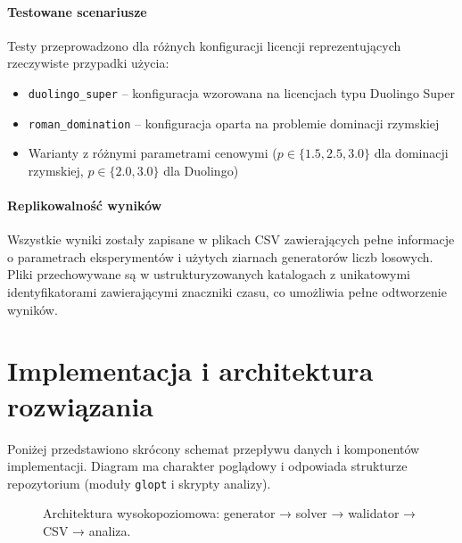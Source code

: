 \paragraph{Testowane scenariusze}
Testy przeprowadzono dla różnych konfiguracji licencji reprezentujących rzeczywiste przypadki użycia:
\begin{itemize}
  \item \texttt{duolingo\_super} -- konfiguracja wzorowana na licencjach typu Duolingo Super
  \item \texttt{roman\_domination} -- konfiguracja oparta na problemie dominacji rzymskiej
  \item Warianty z różnymi parametrami cenowymi ($p \in \{1.5, 2.5, 3.0\}$ dla dominacji rzymskiej, $p \in \{2.0, 3.0\}$ dla Duolingo)
\end{itemize}

\paragraph{Replikowalność wyników}
Wszystkie wyniki zostały zapisane w plikach CSV zawierających pełne informacje o parametrach eksperymentów i użytych ziarnach generatorów liczb losowych. Pliki przechowywane są w ustrukturyzowanych katalogach z unikatowymi identyfikatorami zawierającymi znaczniki czasu, co umożliwia pełne odtworzenie wyników.

\section{Implementacja i architektura rozwiązania}

Poniżej przedstawiono skrócony schemat przepływu danych i komponentów implementacji. Diagram ma charakter poglądowy i odpowiada strukturze repozytorium (moduły \texttt{glopt} i skrypty analizy).

\begin{figure}[H]
  \centering
  \caption{Architektura wysokopoziomowa: generator → solver → walidator → CSV → analiza.}
  \label{fig:arch_overview}
\end{figure}

